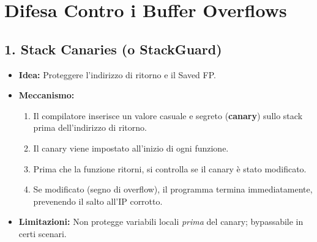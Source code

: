 \newpage
\section{Difesa Contro i Buffer Overflows}

\subsection{1. Stack Canaries (o StackGuard)}
\begin{itemize}
    \item \textbf{Idea:} Proteggere l'indirizzo di ritorno e il Saved FP.
    \item \textbf{Meccanismo:}
        \begin{enumerate}
            \item Il compilatore inserisce un valore casuale e segreto (\textbf{canary}) sullo stack prima dell'indirizzo di ritorno.
            \item Il canary viene impostato all'inizio di ogni funzione.
            \item Prima che la funzione ritorni, si controlla se il canary è stato modificato.
            \item Se modificato (segno di overflow), il programma termina immediatamente, prevenendo il salto all'IP corrotto.
        \end{enumerate}
    \item \textbf{Limitazioni:} Non protegge variabili locali \textit{prima} del canary; bypassabile in certi scenari.
\end{itemize}

